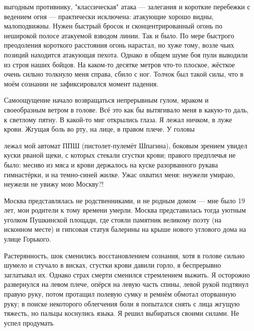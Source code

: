 \label{9-1}
выгодным противнику, "классическая" атака — залегания и короткие перебежки с ведением огня — практически исключена: атакующие хорошо видны, малоподвижны. Нужен быстрый бросок и сконцентрированный огонь по неширокой полосе атакуемой взводом линии. Так и было. По мере быстрого преодоления короткого расстояния огонь нарастал, но хуже тому, возле чьих позиций находится атакующая пехота. Однако в общем шуме боя пули выводили из строя наших бойцов.
На каком-то десятке метров что-то плоское, жёсткое очень сильно толкнуло меня справа, сбило с ног. Толчок был такой силы, что в моём сознании не зафиксировался момент падения.

\label{9-2}
Самоощущение начало возвращаться непрерывным гулом, мраком и своеобразным ветром в голове. Всё это как бы вытягивало меня в какую-то даль, к светлому пятну. В какой-то миг открылись глаза. Я лежал ничком, в луже крови. Жгущая боль во рту, на лице, в правом плече. У головы

\label{10-1}
лежал мой автомат ППШ (пистолет-пулемёт Шпагина), боковым зрением увидел куски рваной щеки, с которых стекали сгустки крови; правого предплечья не было: месиво из мяса и крови держалось на куске разорванного рукава гимнастёрки, и на темно-синей жилке. Ужас охватил меня: неужели умираю, неужели не увижу мою Москву?!

\label{10-2}
Москва представлялась не родственниками, и не родным домом — мне было 19 лет, мои родители к тому времени умерли. Москва представилась тогда уютным уголком Пушкинской площади, где стояли памятник великому поэту (на исконном месте) и гипсовая статуя балерины на крыше нового углового дома на улице Горького.

\label{10-3}
Растерянность, шок сменились восстановлением сознания, хотя в голове сильно шумело и стучало в висках, сгустки крови давили горло, я беспрерывно заглатывал их. Однако страх смерти сменился стремлением выжить. Я осторожно развернулся на левом плече, опёрся на левую часть спины, левой рукой подтянул правую руку, потом протащил полевую сумку и ремнём обмотал оторванную руку; в поиске некоторого облегчения боли я попытался снять с лица жгущую тяжесть, но пальцы коснулись языка. Я решил выбираться своими силами. Не успел продумать

